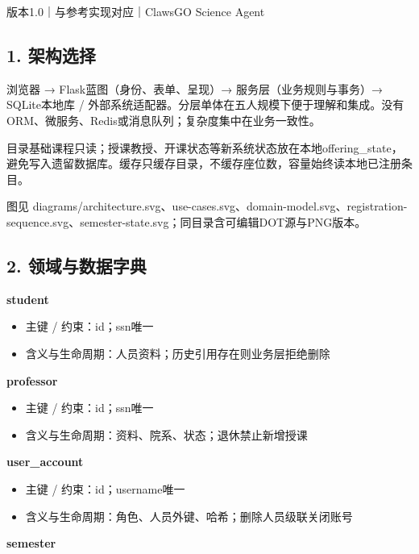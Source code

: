 \documentclass[UTF8,11pt,a4paper]{ctexart}
\providecommand{\tightlist}{\setlength{\itemsep}{0pt}\setlength{\parskip}{0pt}}
\begin{document}
版本1.0｜与参考实现对应｜ClawsGO Science Agent

\hypertarget{1-ux67b6ux6784ux9009ux62e9}{%
\subsection{1. 架构选择}\label{1-ux67b6ux6784ux9009ux62e9}}

浏览器 → Flask蓝图（身份、表单、呈现）→ 服务层（业务规则与事务）→
SQLite本地库 /
外部系统适配器。分层单体在五人规模下便于理解和集成。没有ORM、微服务、Redis或消息队列；复杂度集中在业务一致性。

目录基础课程只读；授课教授、开课状态等新系统状态放在本地offering\_\allowbreak{}state，避免写入遗留数据库。缓存只缓存目录，不缓存座位数，容量始终读本地已注册条目。

图见
diagrams/architecture.svg、use-cases.svg、domain-model.svg、registration-sequence.svg、semester-state.svg；同目录含可编辑DOT源与PNG版本。

\hypertarget{2-ux9886ux57dfux4e0eux6570ux636eux5b57ux5178}{%
\subsection{2.
领域与数据字典}\label{2-ux9886ux57dfux4e0eux6570ux636eux5b57ux5178}}

\textbf{student}

\begin{itemize}
\tightlist
\item
  主键 / 约束：id；ssn唯一
\item
  含义与生命周期：人员资料；历史引用存在则业务层拒绝删除
\end{itemize}

\textbf{professor}

\begin{itemize}
\tightlist
\item
  主键 / 约束：id；ssn唯一
\item
  含义与生命周期：资料、院系、状态；退休禁止新增授课
\end{itemize}

\textbf{user\_\allowbreak{}account}

\begin{itemize}
\tightlist
\item
  主键 / 约束：id；username唯一
\item
  含义与生命周期：角色、人员外键、哈希；删除人员级联关闭账号
\end{itemize}

\textbf{semester}
\end{document}
